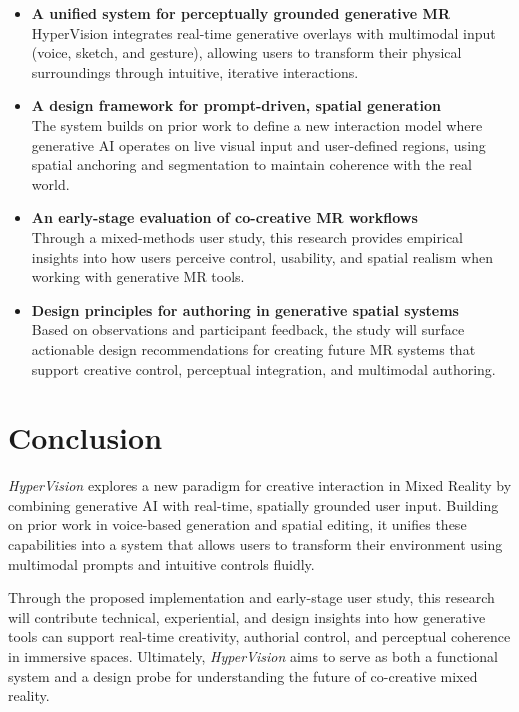 \begin{itemize}
    \item \textbf{A unified system for perceptually grounded generative MR} \\
    HyperVision integrates real-time generative overlays with multimodal input (voice, sketch, and gesture), allowing users to transform their physical surroundings through intuitive, iterative interactions.

    \item \textbf{A design framework for prompt-driven, spatial generation} \\
    The system builds on prior work to define a new interaction model where generative AI operates on live visual input and user-defined regions, using spatial anchoring and segmentation to maintain coherence with the real world.

    \item \textbf{An early-stage evaluation of co-creative MR workflows} \\
    Through a mixed-methods user study, this research provides empirical insights into how users perceive control, usability, and spatial realism when working with generative MR tools.

    \item \textbf{Design principles for authoring in generative spatial systems} \\
    Based on observations and participant feedback, the study will surface actionable design recommendations for creating future MR systems that support creative control, perceptual integration, and multimodal authoring.
\end{itemize}


\section{Conclusion}

\textit{HyperVision} explores a new paradigm for creative interaction in Mixed Reality by combining generative AI with real-time, spatially grounded user input. Building on prior work in voice-based generation and spatial editing, it unifies these capabilities into a system that allows users to transform their environment using multimodal prompts and intuitive controls fluidly.

Through the proposed implementation and early-stage user study, this research will contribute technical, experiential, and design insights into how generative tools can support real-time creativity, authorial control, and perceptual coherence in immersive spaces. Ultimately, \textit{HyperVision} aims to serve as both a functional system and a design probe for understanding the future of co-creative mixed reality.